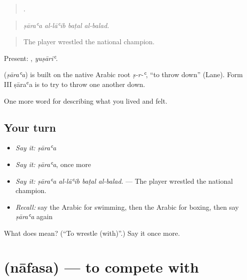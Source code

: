 \begin{quote}
   .
\end{quote}

\begin{quote}
\emph{ṣāraʿa al-lāʿib baṭal al-balad.}
\end{quote}

\begin{quote}
The player wrestled the national champion.
\end{quote}

Present: , \emph{yuṣāriʿ}.

\begin{cousinweb}
\textbf{} (\emph{ṣāraʿa}) is built on the native Arabic root \emph{ṣ-r-ʿ}, \textquotedblleft{}to throw down\textquotedblright{} (Lane). Form III ṣāraʿa is to try to throw one another down.
\end{cousinweb}

\begin{grammarlens}[title={What you've built}]
One more word for describing what you lived and felt.
\end{grammarlens}

\subsection*{Your turn}
\begin{itemize}
\raggedright
  \item \emph{Say it:} \emph{ṣāraʿa}
  \item \emph{Say it:} \emph{ṣāraʿa}, once more
  \item \emph{Say it:} \emph{ṣāraʿa al-lāʿib baṭal al-balad.} — The player wrestled the national champion.
  \item \emph{Recall:} say the Arabic for swimming, then the Arabic for boxing, then say \emph{ṣāraʿa} again
\end{itemize}

\begin{tcolorbox}[breakable,colback=teal!4,colframe=teal!35!black,title={Before you move on}]
What does  mean? (\textquotedblleft{}To wrestle (with)\textquotedblright{}.) Say it once more.
\end{tcolorbox}
\section[\texorpdfstring{\ar{نافس} (nāfasa)}{نافس (nāfasa)}]{ (nāfasa) — to compete with}

